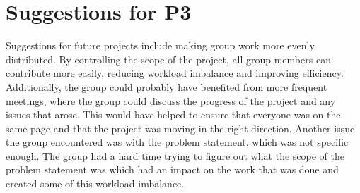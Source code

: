\section{Suggestions for P3}\label{sec:suggestions-for-p3}
Suggestions for future projects include making group work more evenly distributed.
By controlling the scope of the project, all group members can contribute more easily, reducing workload imbalance and
improving efficiency.
Additionally, the group could probably have benefited from more frequent meetings, where the group could discuss the
progress of the project and any issues that arose.
This would have helped to ensure that everyone was on the same page and that the
project was moving in the right direction.
Another issue the group encountered was with the problem statement, which was not specific enough.
The group had a hard time trying to figure out what the scope of the problem statement was which had
an impact on the work that was done and created some of this workload imbalance.
